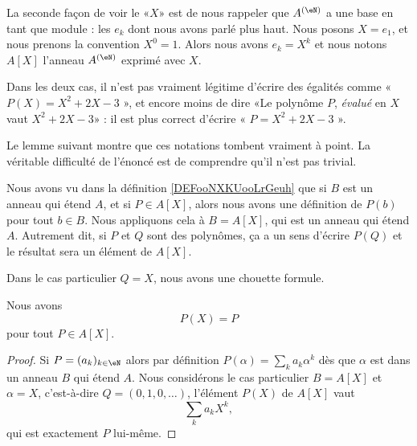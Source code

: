 \begin{normaltext}      \label{NORMooHHIVooSfHlxv}
    La seconde façon de voir le «\( X\)» est de nous rappeler que \( A^{(\eN)}\) a une base en tant que module : les \( e_k\) dont nous avons parlé plus haut. Nous posons \( X=e_1\), et nous prenons la convention \( X^0=1\). Alors nous avons \( e_k=X^k\) et nous notons \( A[X]\) l'anneau \(A^{(\eN)}\) exprimé avec \( X\).

    Dans les deux cas, il n'est pas vraiment légitime d'écrire des égalités comme « \( P(X)=X^2+2X-3\) », et encore moins de dire «Le polynôme \( P\), \emph{évalué} en \( X\) vaut \( X^2+2X-3\)»  : il est plus correct d'écrire « \( P=X^2+2X-3\) ».

    Le lemme suivant montre que ces notations tombent vraiment à point. La véritable difficulté de l'énoncé est de comprendre qu'il n'est pas trivial.

    Nous avons vu dans la définition \ref{DEFooNXKUooLrGeuh} que si \( B\) est un anneau qui étend \( A\), et si \(P\in A[X] \), alors nous avons une définition de \( P(b)\) pour tout \( b\in B\). Nous appliquons cela à \( B=A[X]\), qui est un anneau qui étend \( A\). Autrement dit, si \( P\) et \( Q\) sont des polynômes, ça a un sens d'écrire \( P(Q)\) et le résultat sera un élément de \( A[X]\). 
\end{normaltext}

Dans le cas particulier \( Q=X\), nous avons une chouette formule.
\begin{lemma}       \label{LEMooGKWQooVOyeDX}
    Nous avons
    \begin{equation}
        P(X)=P
    \end{equation}
    pour tout \( P\in A[X]\).
\end{lemma}

\begin{proof}
    Si \( P=(a_k)_{k\in \eN}\) alors par définition \( P(\alpha)=\sum_ka_k\alpha^k\) dès que \( \alpha\) est dans un anneau \( B\) qui étend \( A\). Nous considérons le cas particulier \( B=A[X]\) et \( \alpha=X\), c'est-à-dire \( Q=(0,1,0,\ldots)\), l'élément \( P(X)\) de \( A[X]\) vaut
    \begin{equation}        \label{EQooABULooFCEasf}
        \sum_ka_kX^k,
    \end{equation}
    qui est exactement \( P\) lui-même.
\end{proof}

